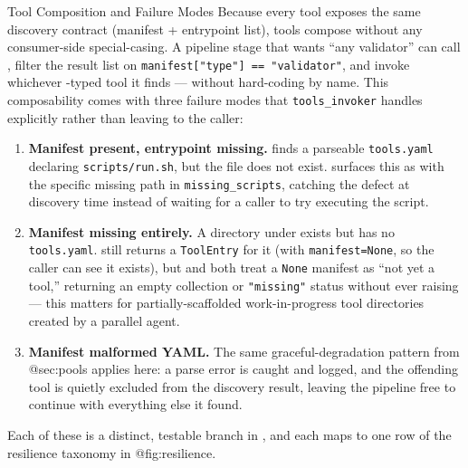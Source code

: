 \documentclass[
  ignorenonframetext,
]{beamer}
\providecommand{\tightlist}{%
  \setlength{\itemsep}{0pt}\setlength{\parskip}{0pt}}
\begin{document}
\begin{frame}{Tool Composition and Failure
Modes}
\protect{}\label{tool-composition-and-failure-modes}
Because every tool exposes the same discovery contract (manifest +
entrypoint list), tools compose without any consumer-side
special-casing. A pipeline stage that wants ``any validator'' can call
, filter the result list on
\texttt{manifest{[}"type"{]}\ ==\ "validator"}, and invoke whichever
-typed tool it finds --- without hard-coding
 by name. This composability comes with
three failure modes that \texttt{tools\_invoker} handles explicitly
rather than leaving to the caller:

\begin{enumerate}
\tightlist
\item
  \textbf{Manifest present, entrypoint missing.}
   finds a parseable \texttt{tools.yaml}
  declaring \texttt{scripts/run.sh}, but the file does not exist.
   surfaces this as
   with the specific missing path in
  \texttt{missing\_scripts}, catching the defect at discovery time
  instead of waiting for a caller to try executing the script.
\item
  \textbf{Manifest missing entirely.} A directory under
   exists but has no \texttt{tools.yaml}.
   still returns a \texttt{ToolEntry} for it
  (with \texttt{manifest=None}, so the caller can see it exists), but
   and
   both treat a \texttt{None}
  manifest as ``not yet a tool,'' returning an empty collection or
  \texttt{"missing"} status without ever raising --- this matters for
  partially-scaffolded work-in-progress tool directories created by a
  parallel agent.
\item
  \textbf{Manifest malformed YAML.} The same graceful-degradation
  pattern from @sec:pools applies here: a parse error is caught and
  logged, and the offending tool is quietly excluded from the discovery
  result, leaving the pipeline free to continue with everything else it
  found.
\end{enumerate}

Each of these is a distinct, testable branch in
, and each maps to one row of the
resilience taxonomy in @fig:resilience.
\end{frame}
\end{document}
